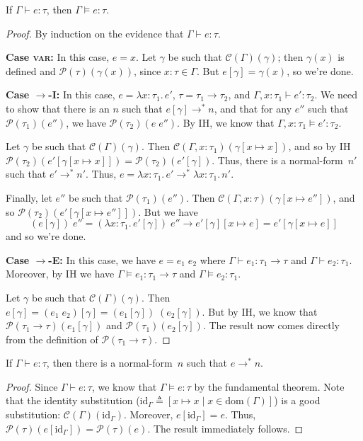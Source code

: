 \documentclass{lecturenotes}
\newcommand{\tabs}[3]{\ensuremath{\lambda #1 \colon #2.\,#3}}
\newcommand{\app}[2]{\ensuremath{#1\;#2}}
\begin{document}
\begin{thm}
  If $\Gamma \vdash e : \tau$, then $\Gamma \vDash e : \tau$.
\end{thm}
\begin{proof}
  By induction on the evidence that $\Gamma \vdash e : \tau$.

  \noindent\textbf{Case \textsc{var}:}
  In this case, $e = x$.
  Let $\gamma$ be such that $\mathcal{C}(\Gamma)(\gamma)$; then $\gamma(x)$ is defined and $\mathcal{P}(\tau)(\gamma(x))$, since $x : \tau \in \Gamma$.
  But $e[\gamma] = \gamma(x)$, so we're done.

  \noindent\textbf{Case \textsc{$\to$-I}:}
  In this case, $e = \tabs{x}{\tau_1}{e'}$, $\tau = \tau_1 \to \tau_2$, and $\Gamma, x : \tau_1 \vdash e' : \tau_2$.
  We need to show that there is an $n$ such that $e[\gamma] \to^\ast n$, and that for any $e''$ such that $\mathcal{P}(\tau_1)(e'')$, we have $\mathcal{P}(\tau_2)(\app{e}{e''})$.
  By IH, we know that $\Gamma, x : \tau_1 \vDash e' : \tau_2$.

  Let $\gamma$ be such that $\mathcal{C}(\Gamma)(\gamma)$.
  Then $\mathcal{C}(\Gamma, x : \tau_1)(\gamma[x \mapsto x])$, and so by IH $\mathcal{P}(\tau_2)(e'[\gamma[x \mapsto x]]) = \mathcal{P}(\tau_2)(e'[\gamma])$.
  Thus, there is a normal-form~$n'$ such that $e' \to^\ast n'$.
  Thus, $e = \tabs{x}{\tau_1}{e'} \to^\ast \tabs{x}{\tau_1}{n'}$.

  Finally, let $e''$ be such that $\mathcal{P}(\tau_1)(e'')$.
  Then $\mathcal{C}(\Gamma, x : \tau)(\gamma[x \mapsto e''])$, and so $\mathcal{P}(\tau_2)(e'[\gamma[x \mapsto e'']])$.
  But we have $$\app{(e[\gamma])}{e''} = \app{(\tabs{x}{\tau_1}{e'[\gamma]})}{e''} \to e'[\gamma][x \mapsto e] = e'[\gamma[x \mapsto e]]$$
  and so we're done.

  \noindent\textbf{Case \textsc{$\to$-E}:}
  In this case, we have $e = \app{e_1}{e_2}$ where $\Gamma \vdash e_1 : \tau_1 \to \tau$ and $\Gamma \vdash e_2 : \tau_1$.
  Moreover, by IH we have $\Gamma \vDash e_1 : \tau_1 \to \tau$ and $\Gamma \vDash e_2 : \tau_1$.

  Let $\gamma$ be such that $\mathcal{C}(\Gamma)(\gamma)$.
  Then $e[\gamma] = (\app{e_1}{e_2})[\gamma] = \app{(e_1[\gamma])}{(e_2[\gamma])}$.
  But by IH, we know that $\mathcal{P}(\tau_1 \to \tau)(e_1[\gamma])$ and $\mathcal{P}(\tau_1)(e_2[\gamma])$.
  The result now comes directly from the definition of $\mathcal{P}(\tau_1 \to \tau)$.  
\end{proof}

\begin{cor}[Normalization]
  If $\Gamma \vdash e : \tau$, then there is a normal-form~$n$ such that $e \to^\ast n$.
\end{cor}
\begin{proof}
  Since $\Gamma \vdash e : \tau$, we know that $\Gamma \vDash e : \tau$ by the fundamental theorem.
  Note that the identity substitution ($\text{id}_\Gamma \triangleq [x \mapsto x \mid x \in \text{dom}(\Gamma)]$) is a good substitution: $\mathcal{C}(\Gamma)(\text{id}_\Gamma)$.
  Moreover, $e[\text{id}_\Gamma] = e$.
  Thus, $\mathcal{P}(\tau)(e[\text{id}_\Gamma]) = \mathcal{P}(\tau)(e)$.
  The result immediately follows.
\end{proof}
\end{document}
